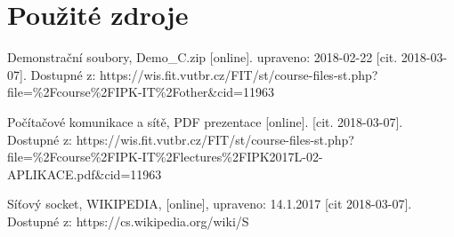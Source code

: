 \documentclass[11pt]{article}
\begin{document}
	\section{Použité zdroje}
	\begin{flushleft}
		Demonstrační soubory, Demo\_C.zip [online]. upraveno: 2018-02-22 [cit. 2018-03-07]. Dostupné z: https://wis.fit.vutbr.cz/FIT/st/course-files-st.php?file=\%2Fcourse\%2FIPK-IT\%2Fother\&cid=11963\par	
	\end{flushleft}	
	\begin{flushleft}
		Počítačové komunikace a sítě, PDF prezentace [online]. [cit. 2018-03-07]. Dostupné z: https://wis.fit.vutbr.cz/FIT/st/course-files-st.php?file=\%2Fcourse\%2FIPK-IT\%2Flectures\%2FIPK2017L-02-APLIKACE.pdf\&cid=11963\par	
	\end{flushleft}
	\begin{flushleft}
		Síťový socket, WIKIPEDIA, [online], upraveno: 14.1.2017 [cit 2018-03-07]. Dostupné z: https://cs.wikipedia.org/wiki/S%
	\end{flushleft}
\end{document}
